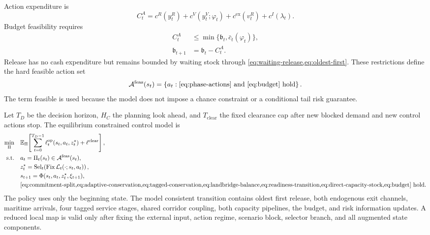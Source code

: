 \documentclass[a4paper,fleqn]{cas-sc}
\newcommand{\E}{\mathbb{E}}
\begin{document}
Action expenditure is
\begin{equation}
 C_t^A=
 c^R(y_t^R)
 +c^V(y_t^V;\varphi_t)
 +c^{\mathrm{ex}}(v_t^R)
 +c^I(\lambda_t).
 \label{eq:action-cost}
\end{equation}
Budget feasibility requires
\begin{subequations}\label{eq:budget}
\begin{align}
 C_t^A&\le
 \min\{\mathfrak b_t,\bar c_t(\varphi_t)\},\\
 \mathfrak b_{t+1}&=\mathfrak b_t-C_t^A.
\end{align}
\end{subequations}
Release has no cash expenditure but remains bounded by waiting stock through
\cref{eq:waiting-release,eq:oldest-first}. These restrictions define the hard
feasible action set
\begin{equation}
 \mathcal A^{\mathrm{feas}}(s_t)
 =
 \left\{a_t:
 \eqref{eq:phase-actions}\ \text{and}\
 \eqref{eq:budget}\ \text{hold}\right\}.
 \label{eq:safe-action-set}
\end{equation}
The term feasible is used because the model does not impose a chance constraint
or a conditional tail risk guarantee.

Let $T_D$ be the decision horizon, $H_C$ the planning look ahead, and
$T_{\mathrm{clear}}$ the fixed clearance cap after new blocked demand and new
control actions stop. The equilibrium constrained control model is
\begin{subequations}\label{eq:unified-model}
\begin{align}
 \min_{\Pi}\quad&
 \E_\Pi\!\left[
 \sum_{t=0}^{T_D-1}
 \ell_t^{\mathrm{op}}(s_t,a_t,z_t^\star)
 +\ell^{\mathrm{clear}}
 \right],
 \label{eq:unified-objective}\\
 \text{s.t.}\quad&
 a_t=\Pi_t(s_t)\in
 \mathcal A^{\mathrm{feas}}(s_t),\\
 &z_t^\star=
 \operatorname{Sel}_t\!\left(
 \operatorname{Fix}
 \mathcal L_t(\cdot;s_t,a_t)
 \right),\\
 &s_{t+1}=
 \Phi(s_t,a_t,z_t^\star,\xi_{t+1}),\\
 &\text{\cref{eq:commitment-split,eq:adaptive-conservation,%
eq:tagged-conservation,eq:landbridge-balance,%
eq:readiness-transition,eq:direct-capacity-stock,eq:budget} hold}.
\end{align}
\end{subequations}
The policy uses only the beginning state. The model consistent transition
contains oldest first release, both endogenous exit channels, maritime
arrivals, four tagged service stages, shared corridor coupling, both capacity
pipelines, the budget, and risk information updates. A reduced local map is
valid only after fixing the external input, action regime, scenario block,
selector branch, and all augmented state components.
\end{document}
